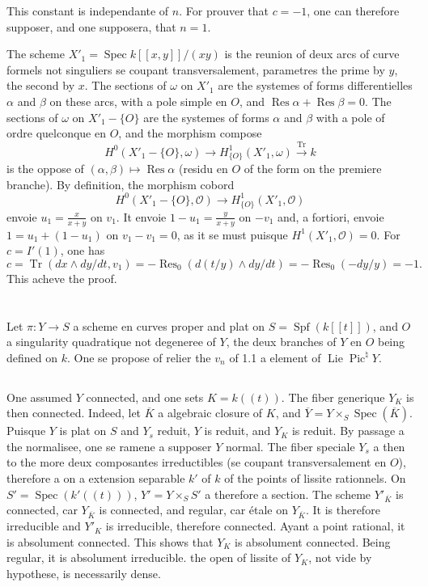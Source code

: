 \documentclass[12pt,a4paper]{article}
\theoremstyle{plain}
\theoremstyle{definition}
\theoremstyle{remark}
\DeclareMathOperator{\Spf}{Spf}
\DeclareMathOperator{\Spec}{Spec}
\DeclareMathOperator{\Lie}{Lie}
\DeclareMathOperator{\Pic}{Pic}
\DeclareMathOperator{\Res}{Res}
\DeclareMathOperator{\Tr}{Tr}
\newcommand{\OO}{\mathcal{O}}
\providecommand{\Spec}{\operatorname{Spec}}
\providecommand{\Lie}{\operatorname{Lie}}
\providecommand{\Tr}{\operatorname{Tr}}
\begin{document}
This constant is independante of $n$. For prouver that $c=-1$, one can therefore
supposer, and one supposera, that $n=1$.

The scheme $X'_1=\Spec k[[x,y]]/(xy)$ is the reunion of deux arcs of curve
formels not singuliers se coupant transversalement, parametres the prime by
$y$, the second by $x$. The sections of $\omega$ on $X'_1$ are the systemes of forms
differentielles $\alpha$ and $\beta$ on these arcs, with a pole simple en $O$, and
$\Res\alpha+\Res\beta=0$. The sections of $\omega$ on $X'_1-\{O\}$ are the systemes of
forms $\alpha$ and $\beta$ with a pole of ordre quelconque en $O$, and the morphism compose
\[
H^0(X'_1-\{O\},\omega)\to H^1_{\{O\}}(X'_1,\omega)\xrightarrow{\Tr} k
\]
is the oppose of $(\alpha,\beta)\mapsto\Res\alpha$ (residu en $O$ of the form on the premiere
branche). By definition, the morphism cobord
\[
H^0(X'_1-\{O\},\OO)\to H^1_{\{O\}}(X'_1,\OO)
\]
envoie $u_1=\frac{x}{x+y}$ on $v_1$. It envoie $1-u_1=\frac{y}{x+y}$ on $-v_1$ and, a fortiori,
envoie $1=u_1+(1-u_1)$ on $v_1-v_1=0$, as it se must puisque $H^1(X'_1,\OO)=0$.
For $c=I'(1)$, one has
\[
c=\Tr(dx\wedge dy/dt, v_1)=-\Res_0(d(t/y)\wedge dy/dt)=-\Res_0(-dy/y)=-1.
\]
This acheve the proof.

\section{}

\subsection{}

Let $\pi:Y\to S$ a scheme en curves proper and plat on $S=\Spf(k[[t]])$,
and $O$ a singularity quadratique not degeneree of $Y$, the deux branches of $Y$ en
$O$ being defined on $k$. One se propose of relier the $v_n$ of 1.1 a element of
$\Lie\Pic^\natural Y$.

\subsection{}

One assumed $Y$ connected, and one sets $K=k((t))$. The fiber generique $Y_K$ is then
connected. Indeed, let $\overline{K}$ a algebraic closure of $K$, and
$\overline{Y}=Y\times_S\Spec(\overline{K})$. Puisque $Y$ is plat on $S$ and $Y_s$ reduit,
$Y$ is reduit, and $Y_K$ is reduit. By passage a the normalisee, one se ramene a supposer
$Y$ normal. The fiber speciale $Y_s$ a then to the more deux composantes irreductibles
(se coupant transversalement en $O$), therefore a on a extension separable $k'$ of $k$ of the
points of lissite rationnels. On $S'=\Spec(k'((t)))$, $Y'=Y\times_S S'$ a therefore a section.
The scheme $Y'_{\overline{K}}$ is connected, car $Y_{\overline{K}}$ is connected, and regular, car étale on
$Y_{\overline{K}}$. It is therefore irreducible and $Y'_K$ is irreducible, therefore connected. Ayant a
point rational, it is absolument connected. This shows that $Y_K$ is absolument connected.
Being regular, it is absolument irreducible. the open of lissite of $Y_K$, not vide by
hypothese, is necessarily dense.
\end{document}
